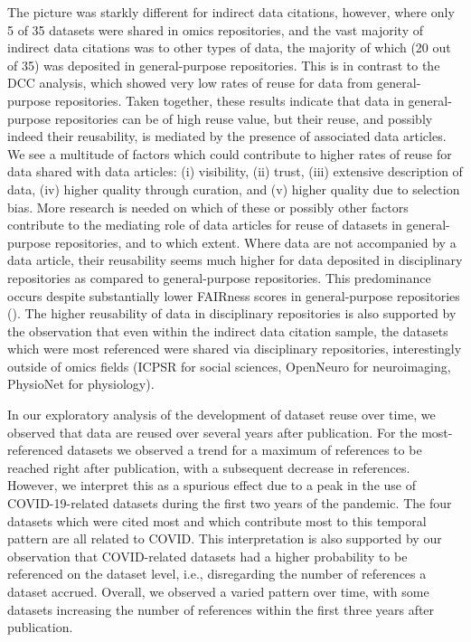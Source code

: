 \documentclass[
  letterpaper,
  DIV=11,
  numbers=noendperiod]{scrartcl}
\begin{document}
The picture was starkly different for indirect data citations, however,
where only 5 of 35 datasets were shared in omics repositories, and the
vast majority of indirect data citations was to other types of data, the
majority of which (20 out of 35) was deposited in general-purpose
repositories. This is in contrast to the DCC analysis, which showed very
low rates of reuse for data from general-purpose repositories. Taken
together, these results indicate that data in general-purpose
repositories can be of high reuse value, but their reuse, and possibly
indeed their reusability, is mediated by the presence of associated data
articles. We see a multitude of factors which could contribute to higher
rates of reuse for data shared with data articles: (i) visibility, (ii)
trust, (iii) extensive description of data, (iv) higher quality through
curation, and (v) higher quality due to selection bias. More research is
needed on which of these or possibly other factors contribute to the
mediating role of data articles for reuse of datasets in general-purpose
repositories, and to which extent. Where data are not accompanied by a
data article, their reusability seems much higher for data deposited in
disciplinary repositories as compared to general-purpose repositories.
This predominance occurs despite substantially lower FAIRness scores in
general-purpose repositories (). The higher
reusability of data in disciplinary repositories is also supported by
the observation that even within the indirect data citation sample, the
datasets which were most referenced were shared via disciplinary
repositories, interestingly outside of omics fields (ICPSR for social
sciences, OpenNeuro for neuroimaging, PhysioNet for physiology).

In our exploratory analysis of the development of dataset reuse over
time, we observed that data are reused over several years after
publication. For the most-referenced datasets we observed a trend for a
maximum of references to be reached right after publication, with a
subsequent decrease in references. However, we interpret this as a
spurious effect due to a peak in the use of COVID-19-related datasets
during the first two years of the pandemic. The four datasets which were
cited most and which contribute most to this temporal pattern are all
related to COVID. This interpretation is also supported by our
observation that COVID-related datasets had a higher probability to be
referenced on the dataset level, i.e., disregarding the number of
references a dataset accrued. Overall, we observed a varied pattern over
time, with some datasets increasing the number of references within the
first three years after publication.
\end{document}

